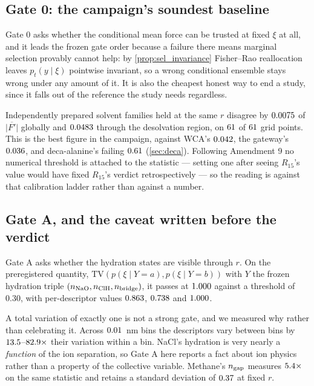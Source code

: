 \subsection{Gate 0: the campaign's soundest baseline}

Gate 0 asks whether the conditional mean force can be trusted at fixed $\xi$ at all, and it leads
the frozen gate order because a failure there means marginal selection provably cannot help: by
\cref{prop:sel_invariance} Fisher--Rao reallocation leaves $p_t(y \mid \xi)$ pointwise invariant,
so a wrong conditional ensemble stays wrong under any amount of it. It is also the cheapest
honest way to end a study, since it falls out of the reference the study needs regardless.

Independently prepared solvent families held at the same $r$ disagree by $0.0075$ of
$\overline{|F'|}$ globally and $0.0483$ through the desolvation region, on
$61$ of $61$ grid points. This is the best figure in the campaign,
against WCA's $0.042$, the gateway's $0.036$, and deca-alanine's failing $0.61$
(\cref{sec:deca}). Following Amendment 9 no numerical threshold is attached to the statistic ---
setting one after seeing $R_{15}$'s value would have fixed $R_{15}$'s verdict retrospectively ---
so the reading is against that calibration ladder rather than against a number.

\subsection{Gate A, and the caveat written before the verdict}

Gate A asks whether the hydration states are visible through $r$. On the preregistered quantity,
$\mathrm{TV}(p(\xi \mid Y = a), p(\xi \mid Y = b))$ with $Y$ the frozen hydration triple
$(n_{\ce{NaO}}, n_{\ce{ClH}}, n_{\rm bridge})$, it passes at $1.000$ against a threshold of
$0.30$, with per-descriptor values $0.863$, $0.738$ and $1.000$.

A total variation of exactly one is not a strong gate, and we measured why rather than
celebrating it. Across $0.01$~nm bins the descriptors vary between bins by
$13.5$--$82.9\times$ their variation within a bin. NaCl's hydration is very nearly a
\emph{function} of the ion separation, so Gate A here reports a fact about ion physics rather
than a property of the collective variable. Methane's $n_{\rm gap}$ measures
$5.4\times$ on the same statistic and retains a standard deviation of
$0.37$ at fixed $r$.

